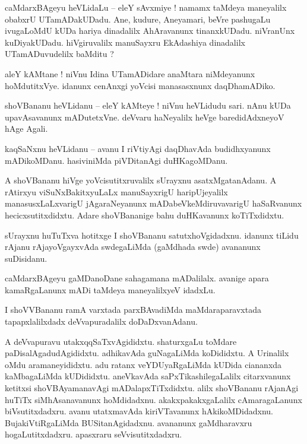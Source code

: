 \documentclass{article}
\begin{document}
\begin{mn}%
caMdarxBAgeyu heVLidaLu -- eleY sAvxmiye ! namamx taMdeya maneyalilx obabxrU UTamADakUDadu. Ane, 
kudure, Aneyamari, beVre pashugaLu ivugaLoMdU kUDa hariya dinadalilx AhAravanunx tinanxkUDadu. 
niVranUnx kuDiyakUDadu. hiVgiruvalilx manuSayxru EkAdashiya dinadalilx UTamADuvudelilx baMditu ?
\end{mn}

\begin{mn}%
aleY kAMtane ! niVnu Idina UTamADidare anaMtara niMdeyanunx hoMdutitxVye. idanunx cenAnxgi yoVcisi 
manasasxnunx daqDhamADiko.
\end{mn}

\begin{mn}%
shoVBananu heVLidanu -- eleY kAMteye ! niVnu heVLidudu sari. nAnu kUDa upavAsavanunx mADutetxVne. 
deVvaru haNeyalilx heVge baredidAdxneyoV hAge Agali.
\end{mn}

\begin{mn}%
kaqSaNxnu heVLidanu -- avanu I riVtiyAgi daqDhavAda budidhxyanunx mADikoMDanu. hasiviniMda 
piVDitanAgi duHKagoMDanu.
\end{mn}

\begin{mn}%
A shoVBananu hiVge yoVcisutitxruvalilx sUrayxnu asatxMgatanAdanu. A rAtirxyu viSuNxBakitxyuLaLx 
manuSayxrigU haripUjeyalilx manasusxLaLxvarigU jAgaraNeyanunx mADabeVkeMdiruvavarigU haSaRvanunx 
hecicxsutitxdidxtu. Adare shoVBananige bahu duHKavanunx koTiTxdidxtu.
\end{mn}

\begin{mn}%
sUrayxnu huTuTxva hotitxge I shoVBananu satutxhoVgidadxnu. idanunx tiLidu rAjanu rAjayoVgayxvAda 
swdegaLiMda (gaMdhada swde) avananunx suDisidanu.
\end{mn}

\begin{mn}%
caMdarxBAgeyu gaMDanoDane sahagamana mADalilalx. avanige apara kamaRgaLanunx mADi taMdeya 
maneyalilxyeV idadxLu.
\end{mn}

\begin{mn}%
I shoVVBananu ramA varxtada parxBAvadiMda maMdaraparavxtada tapapxlalilxdadx deVvapuradalilx 
doDaDxvanAdanu.
\end{mn}

\begin{mn}%
A deVvapuravu utakxqqSaTxvAgididxtu. shaturxgaLu toMdare paDisalAgadudAgididxtu. adhikavAda 
guNagaLiMda koDididxtu. A Urinalilx oMdu aramaneyididxtu. adu ratanx veYDUyaRgaLiMda kUDida 
ciananxda kaMbagaLiMda kUDididxtu. aneVkavAda saPxTikashilegaLalilx citarxvanunx ketitxsi 
shoVBAyamanavAgi mADalapxTiTxdidxtu. alilx shoVBananu rAjanAgi huTiTx siMhAsanavanunx hoMdidadxnu. 
akakxpakakxgaLalilx cAmaragaLanunx biVsutitxdadxru. avanu utatxmavAda kiriVTavanunx 
hAkikoMDidadxnu. BujakiVtiRgaLiMda BUSitanAgidadxnu. avananunx gaMdharavxru hogaLutitxdadxru. 
apasxraru seVvisutitxdadxru.
\end{mn}
\end{document}
